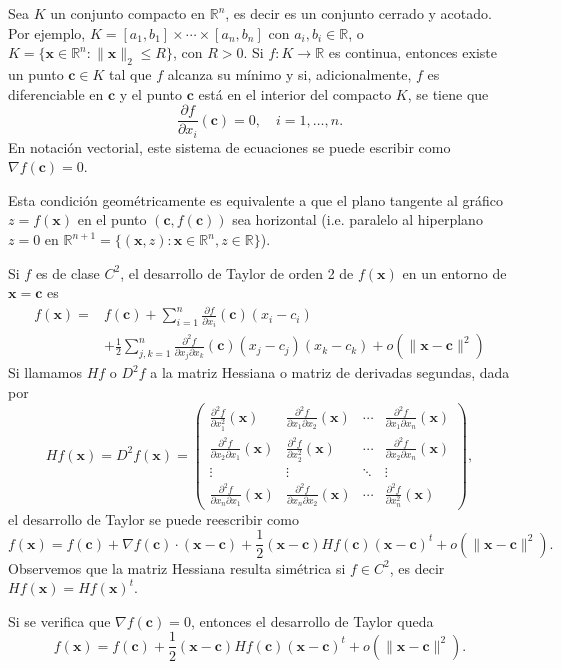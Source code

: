 \documentclass[12pt, a4paper]{amsbook}
\newcommand{\R}{{\mathbb R}}
\newcommand{\xx}{{\mathbf x}}
\newcommand{\cc}{{\mathbf c}}
\theoremstyle{remark}
\theoremstyle{definition}
\numberwithin{section}{chapter}
\numberwithin{subsection}{section}
\numberwithin{equation}{section}
\numberwithin{figure}{chapter}
\begin{document}
Sea $K$ un conjunto compacto en $\R^n$, es decir es un conjunto cerrado y acotado. Por ejemplo, $K=[a_1, b_1]\times\cdots\times [a_n, b_n]$ con $a_i, b_i\in\R$, o $K=\{\xx\in\R^n\colon \|\xx\|_2\le R\}$, con $R>0$. Si $f\colon K\to\R$ es continua, entonces existe un punto $\cc\in K$ tal que $f$ alcanza su mínimo y si, adicionalmente, $f$ es diferenciable en $\cc$ y el punto $\cc$ está en el interior del compacto $K$, se tiene que
$$
\frac{\partial f}{\partial x_i}(\cc) = 0,\quad i=1,\dots,n.
$$
En notación vectorial, este sistema de ecuaciones se puede escribir como $\nabla f(\cc) = 0$.

Esta condición geométricamente es equivalente a que el plano tangente al gráfico $z=f(\xx)$ en el punto $(\cc, f(\cc))$ sea horizontal (i.e. paralelo al hiperplano $z=0$ en $\R^{n+1} = \{(\xx, z)\colon \xx\in\R^n, z\in\R\}$).

Si $f$ es de clase $C^2$, el desarrollo de Taylor de orden 2 de $f(\xx)$ en un entorno de $\xx=\cc$ es
\begin{align*}
f(\xx) = & f(\cc) + \sum_{i=1}^n \frac{\partial f}{\partial x_i}(\cc) (x_i-c_i)\\
& + \frac12 \sum_{j, k = 1}^n \frac{\partial^2 f}{\partial x_j\partial x_k}(\cc)(x_j-c_j)(x_k-c_k) + o(\|\xx-\cc\|^2)
\end{align*}
Si llamamos $Hf$ o $D^2f$ a la matriz Hessiana o matriz de derivadas segundas, dada por
$$
Hf(\xx) = D^2f(\xx) = \begin{pmatrix} \frac{\partial^2 f}{\partial x_1^2}(\xx) & \frac{\partial^2 f}{\partial x_1\partial x_2}(\xx)& \cdots & \frac{\partial^2 f}{\partial x_1\partial x_n}(\xx)\\
\frac{\partial^2 f}{\partial x_2\partial x_1}(\xx) & \frac{\partial^2 f}{\partial x_2^2}(\xx)& \cdots & \frac{\partial^2 f}{\partial x_2\partial x_n}(\xx)\\
\vdots & \vdots & \ddots & \vdots\\
\frac{\partial^2 f}{\partial x_n\partial x_1}(\xx) & \frac{\partial^2 f}{\partial x_n\partial x_2}(\xx) & \cdots & \frac{\partial^2 f}{\partial x_n^2}(\xx)
\end{pmatrix},
$$
el desarrollo de Taylor se puede reescribir como
$$
f(\xx) = f(\cc) + \nabla f(\cc)\cdot(\xx - \cc) + \frac12 (\xx-\cc) Hf(\cc) (\xx-\cc)^t + o(\|\xx-\cc\|^2).
$$
Observemos que la matriz Hessiana resulta simétrica si $f\in C^2$, es decir $Hf(\xx) = Hf(\xx)^t$.

Si se verifica que $\nabla f(\cc)=0$, entonces el desarrollo de Taylor queda
$$
f(\xx) = f(\cc)  + \frac12 (\xx-\cc) Hf(\cc) (\xx-\cc)^t + o(\|\xx-\cc\|^2).
$$
\end{document}
